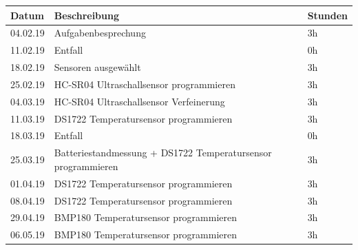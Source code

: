\documentclass[12pt,a4paper,german]{article}
\begin{document}
\begin{table}[H]
\centering 
\begin{tabularx}{\textwidth}{|l|X|l|}
\hline
\textbf{Datum} & \textbf{Beschreibung} & \textbf{Stunden} \\ 
\hline
\hline
04.02.19 & Aufgabenbesprechung & 3h \\ 
\hline
11.02.19 & Entfall & 0h \\ 
\hline
18.02.19 & Sensoren ausgewählt & 3h \\ 
\hline
25.02.19 & HC-SR04 Ultraschallsensor programmieren & 3h \\ 
\hline
04.03.19 & HC-SR04 Ultraschallsensor Verfeinerung & 3h \\ 
\hline
11.03.19 & DS1722 Temperatursensor programmieren & 3h \\ 
\hline
18.03.19 & Entfall & 0h\\ 
\hline
25.03.19 & Batteriestandmessung + DS1722 Temperatursensor programmieren & 3h \\ 
\hline
01.04.19 & DS1722 Temperatursensor programmieren& 3h \\ 
\hline
08.04.19 & DS1722 Temperatursensor programmieren & 3h \\ 
\hline
29.04.19 & BMP180 Temperatursensor programmieren & 3h \\ 
\hline
06.05.19 & BMP180 Temperatursensor programmieren & 3h \\ 
\hline
\hline
\end{tabularx}
\end{table}
\end{document}
